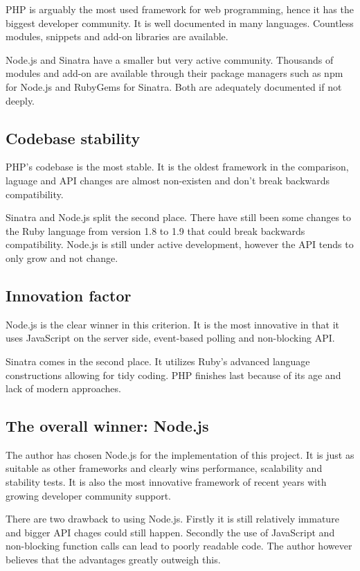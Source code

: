 \documentclass[12pt,oneside]{fithesis}
\begin{document}
		PHP is arguably the most used framework for web programming, hence it has the biggest developer community. It is well documented in many languages. Countless modules, snippets and add-on libraries are available.
		
		Node.js and Sinatra have a smaller but very active community. Thousands of modules and add-on are available through their package managers such as npm for Node.js and RubyGems for Sinatra. Both are adequately documented if not deeply. 
		
	\subsection{Codebase stability}
		PHP's codebase is the most stable. It is the oldest framework in the comparison, laguage and API changes are almost non-existen and don't break backwards compatibility.
		
		Sinatra and Node.js split the second place. There have still been some changes to the Ruby language from version 1.8 to 1.9 that could break backwards compatibility. Node.js is still under active development, however the API tends to only grow and not change.
		
	\subsection{Innovation factor}
		Node.js is the clear winner in this criterion. It is the most innovative in that it uses JavaScript on the server side, event-based polling and non-blocking API.
		
		Sinatra comes in the second place. It utilizes Ruby's advanced language constructions allowing for tidy coding. PHP finishes last because of its age and lack of modern approaches.
		
	\subsection{The overall winner: Node.js}
		The author has chosen Node.js for the implementation of this project. It is just as suitable as other frameworks and clearly wins performance, scalability and stability tests. It is also the most innovative framework of recent years with growing developer community support.
		
		There are two drawback to using Node.js. Firstly it is still relatively immature and bigger API chages could still happen. Secondly the use of JavaScript and non-blocking function calls can lead to poorly readable code. The author however believes that the advantages greatly outweigh this.
\end{document}
